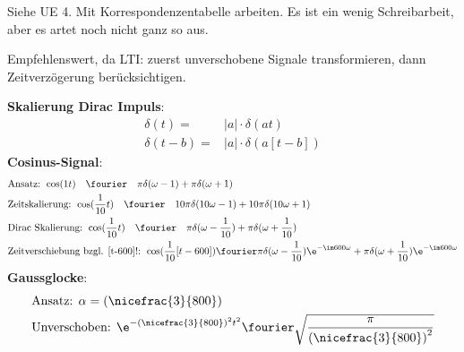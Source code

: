 \begin{Werkzeug}
Siehe UE 4. Mit Korrespondenzentabelle arbeiten. Es ist ein wenig Schreibarbeit,
aber es artet noch nicht ganz so aus.
\end{Werkzeug}
\begin{Ansatz}
Empfehlenswert, da LTI: zuerst unverschobene Signale transformieren,
dann Zeitverzögerung berücksichtigen.
\end{Ansatz}
\begin{ExCalc}

\noindent\textbf{Skalierung Dirac Impuls}:
\begin{align}
\delta(t) =& |a| \cdot \delta(a t)\\
\delta(t-b) = & |a| \cdot \delta(a [t-b])
\end{align}
%
\noindent\textbf{Cosinus-Signal}:
\begin{align}
&\text{Ansatz: } \cos(1 t) \quad\fourier\quad \pi\delta(\omega - 1) + \pi\delta(\omega + 1)\\
&\text{Zeitskalierung: } \cos(\frac{1}{10} t) \quad\fourier\quad 10 \pi\delta(10 \omega - 1) + 10 \pi\delta(10 \omega + 1) \\
&\text{Dirac Skalierung: } \cos(\frac{1}{10} t) \quad\fourier\quad \pi\delta(\omega - \frac{1}{10}) + \pi\delta(\omega + \frac{1}{10}) \\
&\text{Zeitverschiebung bzgl. [t-600]!: } \cos(\frac{1}{10} [t - 600]) \fourier \pi\delta(\omega - \frac{1}{10})\e^{-\im 600 \omega} + \pi\delta(\omega + \frac{1}{10})\e^{-\im 600 \omega}
\end{align}
%
\noindent\textbf{Gaussglocke}:
\begin{align}
&\text{Ansatz: } \alpha = \left(\nicefrac{3}{800}\right)\\
&\text{Unverschoben: } \e^{-\left(\nicefrac{3}{800}\right)^2 t^2} \fourier \sqrt{\frac{\pi}{\left(\nicefrac{3}{800}\right)^2}}

\end{align}
\end{ExCalc}
